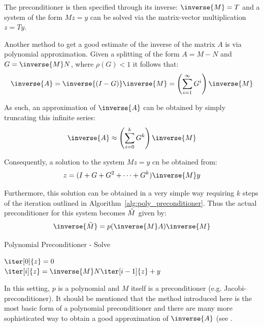 \noindent The preconditioner is then specified through its inverse: $\inverse{M}=T$ and a system of the form $Mz=y$ can be solved via the matrix-vector multiplication $z=Ty$.

Another method to get a good estimate of the inverse of the matrix $A$ is via polynomial approximation. Given a splitting of the form $A=M-N$ and $G=\inverse{M}N$, where $\rho(G)<1$ it follows that:
\begin{equation}
    \inverse{A}=\inverse{(I-G)}\inverse{M} = \left(\sum_{i=1}^{\infty}G^i\right)\inverse{M}
\end{equation}

\noindent As such, an approximation of $\inverse{A}$ can be obtained by simply truncating this infinite series:
\begin{equation}
    \inverse{A} \approx \left(\sum_{i=0}^{k}G^k\right)\inverse{M}
\end{equation}

\noindent Consequently, a solution to the system $Mz=y$ cn be obtained from:
\begin{equation}
    z = (I+G+G^2+\dots+G^k)\inverse{M}y
\end{equation}

\noindent Furthermore, this solution can be obtained in a very simple way requiring $k$ steps of the iteration outlined in Algorithm~\hyperref[alg:poly_preconditioner]{\ref{alg:poly_preconditioner}}. Thus the actual preconditioner for this system becomes $\Tilde{M}$ given by:
\begin{equation}
    \inverse{\Tilde{M}}=p(\inverse{M}A)\inverse{M}
\end{equation}

\begin{algorithm}[h]
  \caption{Polynomial Preconditioner - Solve}
  \label{alg:poly_preconditioner}
  \SetAlgoLined
  \DontPrintSemicolon
  $\iter[0]{z} = 0$ \\
   {
    $\iter[i]{z} = \inverse{M}N\iter[i-1]{z}+y$ \\
  }
\end{algorithm}

\noindent In this setting, $p$ is a polynomial and $M$ itself is a preconditioner (e.g. Jacobi-preconditioner). It should be mentioned that the method introduced here is the most basic form of a polynomial preconditioner and there are many more sophisticated way to obtain a good approximation of $\inverse{A}$ (see \cite{golub_matrix_2013}.


